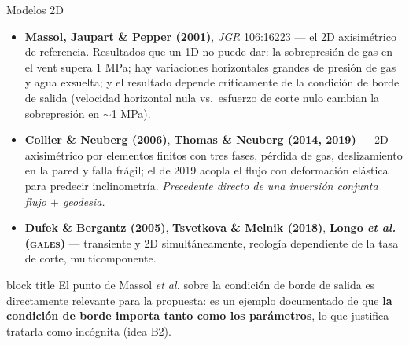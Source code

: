 \documentclass[aspectratio=169,10pt,t]{beamer}
\newcommand{\mensaje}[1]{%
  \vfill
  \begin{beamercolorbox}[wd=\linewidth,sep=0.4em,rounded=true]{block title}
  \footnotesize #1
  \end{beamercolorbox}}
\begin{document}
\begin{frame}{Modelos 2D}
\footnotesize
\begin{itemize}
  \item \textbf{Massol, Jaupart \& Pepper (2001)}, \emph{JGR} 106:16223 — el 2D
    axisimétrico de referencia. Resultados que un 1D no puede dar: la
    sobrepresión de gas en el vent supera 1 MPa; hay variaciones
    \alert{horizontales} grandes de presión de gas y agua exsuelta; y el
    resultado depende críticamente de la \alert{condición de borde de salida}
    (velocidad horizontal nula vs.\ esfuerzo de corte nulo cambian la
    sobrepresión en $\sim$1 MPa).
  \item \textbf{Collier \& Neuberg (2006)}, \textbf{Thomas \& Neuberg (2014,
    2019)} — 2D axisimétrico por elementos finitos con tres fases, pérdida de
    gas, deslizamiento en la pared y falla frágil; el de 2019 acopla el flujo con
    deformación elástica para predecir inclinometría. \emph{Precedente directo de
    una inversión conjunta flujo $+$ geodesia.}
  \item \textbf{Dufek \& Bergantz (2005)}, \textbf{Tsvetkova \& Melnik (2018)},
    \textbf{Longo \emph{et al.} (\textsc{gales})} — transiente y 2D
    simultáneamente, reología dependiente de la tasa de corte, multicomponente.
\end{itemize}

\mensaje{El punto de Massol \emph{et al.} sobre la condición de borde de salida
es directamente relevante para la propuesta: es un ejemplo documentado de que
\textbf{la condición de borde importa tanto como los parámetros}, lo que
justifica tratarla como incógnita (idea B2).}
\end{frame}
\end{document}
